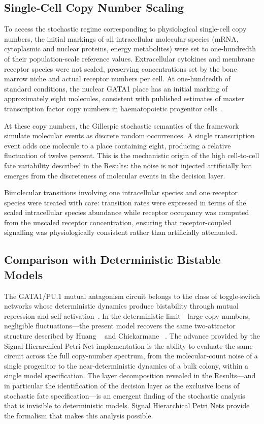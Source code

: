 \subsection{Single-Cell Copy Number Scaling}
\label{sec:scaling}

To access the stochastic regime corresponding to physiological single-cell copy
numbers, the initial markings of all intracellular molecular species (mRNA,
cytoplasmic and nuclear proteins, energy metabolites) were set to one-hundredth
of their population-scale reference values. Extracellular cytokines and membrane
receptor species were not scaled, preserving concentrations set by the bone
marrow niche and actual receptor numbers per cell. At one-hundredth of standard
conditions, the nuclear GATA1 place has an initial marking of approximately eight
molecules, consistent with published estimates of master transcription factor
copy numbers in haematopoietic progenitor cells~\cite{chang2008}.

At these copy numbers, the Gillespie stochastic semantics of the framework
simulate molecular events as discrete random occurrences. A single transcription
event adds one molecule to a place containing eight, producing a relative
fluctuation of twelve percent. This is the mechanistic origin of the high
cell-to-cell fate variability described in the Results: the noise is not injected
artificially but emerges from the discreteness of molecular events in the
decision layer.

Bimolecular transitions involving one intracellular species and one receptor
species were treated with care: transition rates were expressed in terms of the
scaled intracellular species abundance while receptor occupancy was computed from
the unscaled receptor concentration, ensuring that receptor-coupled signalling
was physiologically consistent rather than artificially attenuated.

\subsection{Comparison with Deterministic Bistable Models}

The GATA1/PU.1 mutual antagonism circuit belongs to the class of toggle-switch
networks whose deterministic dynamics produce bistability through mutual repression
and self-activation~\cite{huang2007}. In the deterministic limit---large copy
numbers, negligible fluctuations---the present model recovers the same two-attractor
structure described by Huang \etal~\cite{huang2007} and Chickarmane
\etal~\cite{chickarmane2009}. The advance provided by the Signal Hierarchical
Petri Net implementation is the ability to evaluate the same circuit across the
full copy-number spectrum, from the molecular-count noise of a single progenitor
to the near-deterministic dynamics of a bulk colony, within a single model
specification. The layer decomposition revealed in the Results---and in particular
the identification of the decision layer as the exclusive locus of stochastic
fate specification---is an emergent finding of the stochastic analysis that is
invisible to deterministic models. Signal Hierarchical Petri Nets provide the
formalism that makes this analysis possible.
